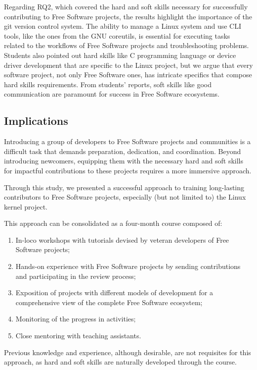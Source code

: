 Regarding RQ2, which covered the hard and soft skills necessary for successfully
contributing to Free Software projects, the results highlight the importance of
the git version control system. The ability to manage a Linux system and use CLI
tools, like the ones from the GNU coreutils, is essential for executing tasks
related to the workflows of Free Software projects and troubleshooting problems.
Students also pointed out hard skills like C programming language or device
driver development that are specific to the Linux project, but we argue that
every software project, not only Free Software ones, has intricate specifics
that compose hard skills requirements. From students' reports, soft skills like
good communication are paramount for success in Free Software ecosystems.

\subsection{Implications}

Introducing a group of developers to Free Software projects and communities is a
difficult task that demands preparation, dedication, and coordination. Beyond
introducing newcomers, equipping them with the necessary hard and soft skills
for impactful contributions to these projects requires a more immersive
approach. 

Through this study, we presented a successful approach to training long-lasting
contributors to Free Software projects, especially (but not limited to) the
Linux kernel project.

This approach can be consolidated as a four-month course composed of:

\begin{enumerate}
    \item In-loco workshops with tutorials devised by veteran developers of Free
    Software projects;
    \item Hands-on experience with Free Software projects by sending
    contributions and participating in the review process;
    \item Exposition of projects with different models of development for a
    comprehensive view of the complete Free Software ecosystem;
    \item Monitoring of the progress in activities;
    \item Close mentoring with teaching assistants.
\end{enumerate}

Previous knowledge and experience, although desirable, are not requisites for
this approach, as hard and soft skills are naturally developed through the
course.

